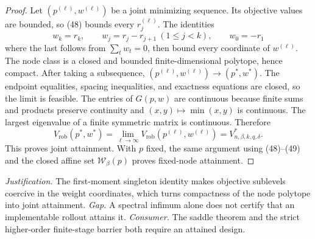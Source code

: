 \documentclass{article}
\begin{document}
\begin{proof}
Let \((p^{(\ell)},w^{(\ell)})\) be a joint minimizing sequence.  Its objective values are bounded, so (48) bounds every \(r_j^{(\ell)}\).  The identities
\[
w_k=r_k,
\qquad
w_j=r_j-r_{j+1}\ (1\le j<k),
\qquad
w_0=-r_1
\tag{49}
\]
where the last follows from \(\sum_tw_t=0\), then bound every coordinate of \(w^{(\ell)}\).  The node class is a closed and bounded finite-dimensional polytope, hence compact.  After taking a subsequence, \((p^{(\ell)},w^{(\ell)})\to(p^*,w^*)\).  The endpoint equalities, spacing inequalities, and exactness equations are closed, so the limit is feasible.  The entries of \(G(p,w)\) are continuous because finite sums and products preserve continuity and \((x,y)\mapsto\min(x,y)\) is continuous.  The largest eigenvalue of a finite symmetric matrix is continuous.  Therefore
\[
V_{\mathrm{rob}}(p^*,w^*)
=\lim_{\ell\to\infty}V_{\mathrm{rob}}(p^{(\ell)},w^{(\ell)})
=V^*_{n,\beta,k,q,\delta}.
\]
This proves joint attainment.  With \(p\) fixed, the same argument using (48)--(49) and the closed affine set \(\mathcal W_\beta(p)\) proves fixed-node attainment.
\end{proof}
\par\smallskip\noindent \textit{Justification.} The first-moment singleton identity makes objective sublevels coercive in the weight coordinates, which turns compactness of the node polytope into joint attainment. \textit{Gap.} A spectral infimum alone does not certify that an implementable rollout attains it. \textit{Consumer.} The saddle theorem and the strict higher-order finite-stage barrier both require an attained design.
\end{document}
